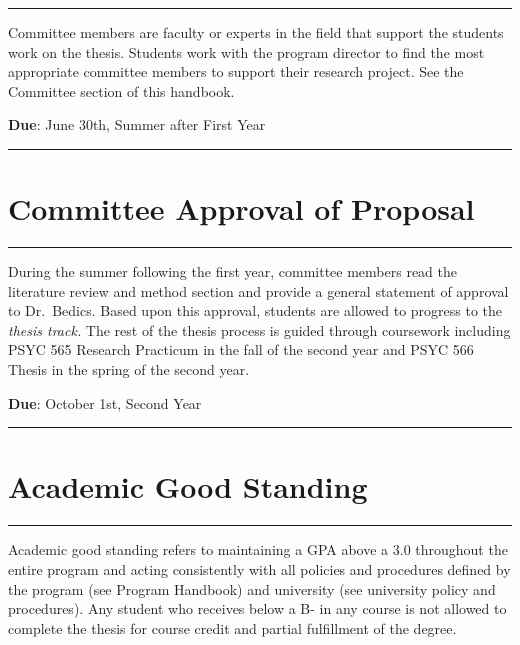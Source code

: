 \documentclass[openany]{book}
\begin{document}
\begin{center}\rule{0.5\linewidth}{0.5pt}\end{center}

Committee members are faculty or experts in the field that support the students work on the thesis. Students work with the program director to find the most appropriate committee members to support their research project. See the Committee section of this handbook.

\textbf{Due}: June 30th, Summer after First Year

\begin{center}\rule{0.5\linewidth}{0.5pt}\end{center}

\hypertarget{committee-approval-of-proposal}{%
\section{Committee Approval of Proposal}\label{committee-approval-of-proposal}}

\begin{center}\rule{0.5\linewidth}{0.5pt}\end{center}

During the summer following the first year, committee members read the literature review and method section and provide a general statement of approval to Dr.~Bedics. Based upon this approval, students are allowed to progress to the \emph{thesis track.} The rest of the thesis process is guided through coursework including PSYC 565 Research Practicum in the fall of the second year and PSYC 566 Thesis in the spring of the second year.

\textbf{Due}: October 1st, Second Year

\begin{center}\rule{0.5\linewidth}{0.5pt}\end{center}

\hypertarget{academic-good-standing}{%
\section{Academic Good Standing}\label{academic-good-standing}}

\begin{center}\rule{0.5\linewidth}{0.5pt}\end{center}

Academic good standing refers to maintaining a GPA above a 3.0 throughout the entire program and acting consistently with all policies and procedures defined by the program (see Program Handbook) and university (see university policy and procedures). Any student who receives below a B- in any course is not allowed to complete the thesis for course credit and partial fulfillment of the degree.
\end{document}
